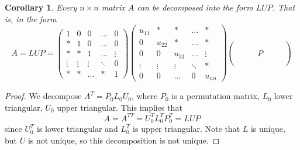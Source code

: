 \documentclass{article}
\newtheorem{corollary}{Corollary}[theorem]
\theoremstyle{remark}
\theoremstyle{definition}
\begin{document}
\begin{corollary}
Every $n \times n$ matrix $A$ can be decomposed into the form $L U P$. That is, in the form
\[ A = L U P = 
\begin{pmatrix}
1 & 0 & 0 & \ldots & 0\\
* & 1 & 0 & \ldots & 0\\
* & * & 1 & \ldots & \vdots\\
\vdots & \vdots & \vdots & \ddots & 0\\
* & * & ... & * & 1 
\end{pmatrix}
\begin{pmatrix}
u_{11} & * & * & \ldots & *\\
0 & u_{22} & * & \ldots & *\\
0 & 0 & u_{33} & \ldots & \vdots\\
\vdots & \vdots & \vdots & \ddots & * \\
0 & 0 & \ldots & 0 & u_{n n} 
\end{pmatrix}
\begin{pmatrix}
\\
\\
 & & & P & & & \\
\\
 & 
\end{pmatrix}\]
\end{corollary}

\begin{proof}
We decompose $A^T = P_0 L_0 U_0$, where $P_0$ is a permutation matrix, $L_0$ lower triangular, $U_0$ upper triangular. This implies that 
\[ A = A^{T T} = U_0^T L_0^T P_0^T = L U P\]
since $U_0^T$ is lower triangular and $L_0^T$ is upper triangular. Note that $L$ is unique, but $U$ is not unique, so this decomposition is not unique. 
\end{proof}
\end{document}
